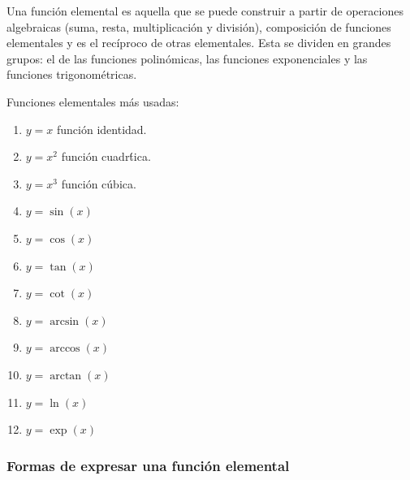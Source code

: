 \documentclass[10pt,twoside]{SelfArx} %
\begin{document}
	
\begin{thm}
	Una función elemental es aquella que se puede construir a partir de operaciones algebraicas (suma, resta, multiplicación y división), composición de funciones elementales y es el recíproco de otras elementales. Esta se dividen en grandes grupos: el de las funciones polinómicas, las funciones exponenciales y las funciones trigonométricas.\\
		
\end{thm}
Funciones elementales más usadas:\\
\begin{enumerate}
	\item$ y=x $ funci\'on identidad.
	\item$ y=x^{2} $ funci\'on cuadr\'tica.
	\item$ y=x^{3} $ funci\'on c\'ubica.
	\item$ y=\sin(x) $
	\item$ y=\cos(x) $
	\item$ y=\tan(x) $
	\item$ y=\cot(x) $
	\item$ y=\arcsin(x) $
	\item$ y=\arccos(x) $
	\item$ y=\arctan(x) $
	\item$ y=\ln(x) $
	\item$ y=\exp(x) $

\end{enumerate}






























\subsubsection{Formas de expresar una función elemental}
\end{document}
